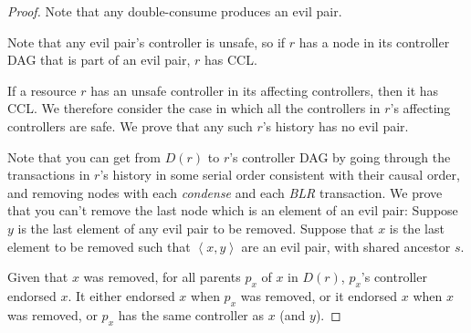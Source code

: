 \documentclass[a4paper,USenglish,cleveref, autoref, thm-restate, anonymous]{lipics-v2021}
\newcommand{\p}[1]{{\ensuremath{\left({{#1}}\right)}}}
\newcommand{\an}[1]{{\left\langle{{#1}}\right\rangle}}
\begin{document}
\begin{proof}
Note that any double-consume produces an evil pair. 

Note that any evil pair's controller is unsafe, so if $r$ has a node in its controller DAG that is part of an evil pair, $r$ has CCL.



If a resource $r$ has an unsafe controller in its affecting controllers, then it has CCL. 
We therefore consider the case in which all the controllers in $r$'s affecting controllers are safe.
We prove that any such $r$'s history has no evil pair. 

Note that you can get from $D\p r$ to $r$'s controller DAG by going through the transactions in $r$'s history in some serial order consistent with their causal order, and removing nodes with each \emph{condense} and each \emph{BLR} transaction.
We prove that you can't remove the last node which is an element of an evil pair:
Suppose $y$ is the last element of any evil pair to be removed.
Suppose that $x$ is the last element to be removed such that $\an{x,y}$ are an evil pair, with shared ancestor $s$.




Given that $x$ was removed, for all parents $p_x$ of $x$ in $D\p r$, $p_x$'s controller endorsed $x$. 
It either endorsed $x$ when $p_x$ was removed, or it endorsed $x$ when $x$ was removed, or $p_x$ has the same controller as $x$ (and $y$). 


\end{proof}
\end{document}
